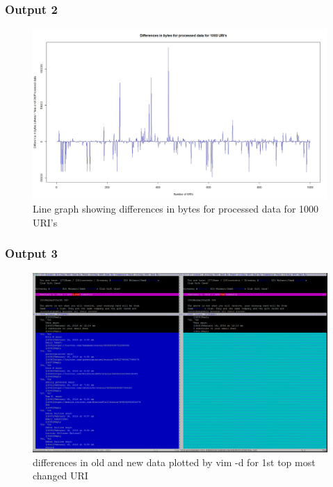 \subsubsection{Output 2}
\begin{figure}[ht]    
    \begin{center}
        \includegraphics[scale=0.3]{processed_graph.jpeg}
        \caption{Line graph showing differences in bytes for processed data for 1000 URI's }
        \label{Samplet42}
    \end{center}
\end{figure}
\newpage


\subsubsection{Output 3}
\begin{figure}[ht]    
    \begin{center}
        \includegraphics[scale=0.4]{output441.png}
        \caption{differences in old and new data plotted by vim -d for 1st top most changed URI }
        \label{Samplet43}
    \end{center}
\end{figure}
\newpage


